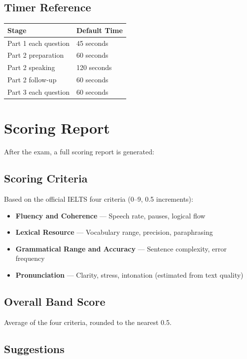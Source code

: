 \documentclass[12pt,a4paper]{article}
\begin{document}
\subsection{Timer Reference}

\begin{tabularx}{\textwidth}{lX}
  \hline
  Stage & Default Time \\
  \hline
  Part 1 each question & 45 seconds \\
  Part 2 preparation & 60 seconds \\
  Part 2 speaking & 120 seconds \\
  Part 2 follow-up & 60 seconds \\
  Part 3 each question & 60 seconds \\
  \hline
\end{tabularx}

\newpage

\section{Scoring Report}

After the exam, a full scoring report is generated:

\subsection{Scoring Criteria}

Based on the official IELTS four criteria (0--9, 0.5 increments):

\begin{itemize}[leftmargin=*]
  \item \textbf{Fluency and Coherence} --- Speech rate, pauses, logical flow
  \item \textbf{Lexical Resource} --- Vocabulary range, precision, paraphrasing
  \item \textbf{Grammatical Range and Accuracy} --- Sentence complexity, error frequency
  \item \textbf{Pronunciation} --- Clarity, stress, intonation (estimated from text quality)
\end{itemize}

\subsection{Overall Band Score}

Average of the four criteria, rounded to the nearest 0.5.

\subsection{Suggestions}
\end{document}
